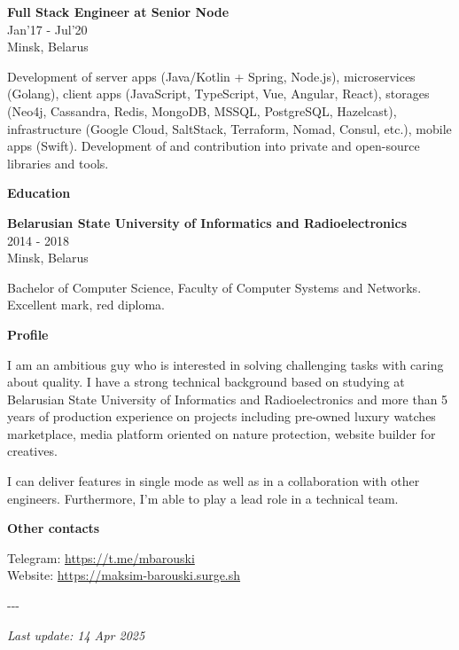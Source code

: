 \documentclass[11pt]{article}
\newcommand{\lastupdate}{14 Apr 2025}
\newcommand{\link}[1]{\href{#1}{\textcolor{linkblue}{#1}}}
\newcommand{\cvsection}[1]{%
  \par\bigskip\noindent\textbf{#1}\par\medskip}
\newcommand{\cventry}[3]{%
  \par\medskip\noindent\textbf{#1}\\
  {\small #2}\\
  {\small #3}\par\medskip}
\begin{document}
\cventry{Full Stack Engineer at Senior Node}{Jan'17 - Jul'20}{Minsk, Belarus}

Development of server apps (Java/Kotlin + Spring, Node.js), microservices
(Golang), client apps (JavaScript, TypeScript, Vue, Angular, React), storages
(Neo4j, Cassandra, Redis, MongoDB, MSSQL, PostgreSQL, Hazelcast),
infrastructure (Google Cloud, SaltStack, Terraform, Nomad, Consul, etc.),
mobile apps (Swift). Development of and contribution into private and
open-source libraries and tools.

\cvsection{Education}

\cventry{Belarusian State University of Informatics and Radioelectronics}{2014 - 2018}{Minsk, Belarus}

Bachelor of Computer Science, Faculty of Computer Systems and Networks.
Excellent mark, red diploma.

\cvsection{Profile}

I am an ambitious guy who is interested in solving challenging tasks with
caring about quality. I have a strong technical background based on studying
at Belarusian State University of Informatics and Radioelectronics and more
than 5 years of production experience on projects including pre-owned luxury
watches marketplace, media platform oriented on nature protection, website
builder for creatives.

I can deliver features in single mode as well as in a collaboration with other
engineers. Furthermore, I'm able to play a lead role in a technical team.

\cvsection{Other contacts}

\noindent Telegram: \link{https://t.me/mbarouski}\\
Website: \link{https://maksim-barouski.surge.sh}

\bigskip
\noindent -{}-{}-

\bigskip
\noindent\textit{Last update: \lastupdate}
\end{document}
